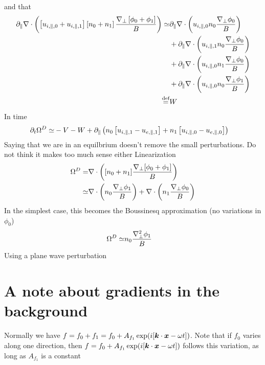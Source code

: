 and that
\begin{align*}
    \partial_\|\nabla\cdot \left(
  \left[ u_{i,\|,0} + u_{i,\|,1} \right]
  \left[ n_0 + n_1 \right]
  \frac{\nabla_\perp
  \left[ \phi_0 + \phi_1 \right]
  }{B}\right)
  \simeq&
    \partial_\|\nabla\cdot \left( u_{i,\|,0} n_0 \frac{\nabla_\perp \phi_0 }{B}\right)
    \\&
    + \partial_\|\nabla\cdot \left( u_{i,\|,1} n_0 \frac{\nabla_\perp \phi_0 }{B}\right)
    \\&
    + \partial_\|\nabla\cdot \left( u_{i,\|,0} n_1 \frac{\nabla_\perp \phi_0 }{B}\right)
    \\&
    + \partial_\|\nabla\cdot \left( u_{i,\|,0} n_0 \frac{\nabla_\perp \phi_1 }{B}\right)
    \\
    \overset{\text{def}}{=}& W
\end{align*}
In time
\begin{align*}
  \partial_t \Omega^D
  \simeq&
  - V
  - W
 + \partial_\| \left(n_0\left[ u_{i,\|,1} - u_{e,\|,1} \right]+n_1\left[ u_{i,\|,0} - u_{e,\|,0} \right]\right)
\end{align*}
%
Saying that we are in an equilbrium doesn't remove the small perturbations. Do
not think it makes too much sense either
%
Linearization
\begin{align*}
    \Omega^D =& \nabla\cdot\left([n_0+n_1]\frac{\nabla_\perp[\phi_0+\phi_1]}{B}\right)\\
    \simeq&
    \nabla\cdot\left(n_0\frac{\nabla_\perp\phi_1}{B}\right)
    + \nabla\cdot\left(n_1\frac{\nabla_\perp\phi_0}{B}\right)
\end{align*}
In the simplest case, this becomes the Boussinesq approximation (no variations
in $\phi_0$)
\begin{align*}
    \Omega^D
    \simeq&
    n_0\frac{\nabla_\perp^2\phi_1}{B}
\end{align*}
Using a plane wave perturbation

\section{A note about gradients in the background}
Normally we have $f=f_0+f_1=f_0+A_{f_1}\exp(i[\boldsymbol{k}\cdot\boldsymbol{x}-\omega t])$. Note
that if $f_0$ varies along one direction, then
$f=f_0+A_{f_1}\exp(i[\boldsymbol{k}\cdot\boldsymbol{x}-\omega t])$ follows this variation, as long
as $A_{f_1}$ is a constant
